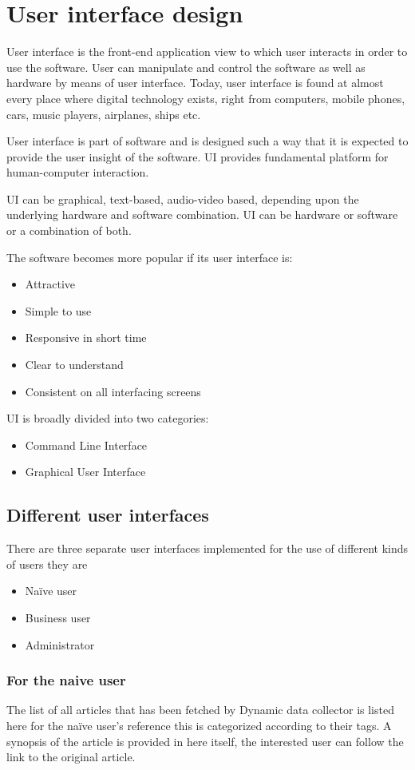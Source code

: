 \section{User interface design}
\par 
User interface is the front-end application view to which user interacts in order to use the software. User can manipulate and control the software as well as hardware by means of user interface. Today, user interface is found at almost every place where digital technology exists, right from computers, mobile phones, cars, music players, airplanes, ships etc.
\par User interface is part of software and is designed such a way that it is expected to provide the user insight of the software. UI provides fundamental platform for human-computer interaction.
\par UI can be graphical, text-based, audio-video based, depending upon the underlying hardware and software combination. UI can be hardware or software or a combination of both.

The software becomes more popular if its user interface is:
\begin{itemize}
\item Attractive
\item Simple to use
\item Responsive in short time
\item Clear to understand
\item Consistent on all interfacing screens
\end{itemize}
UI is broadly divided into two categories:
\begin{itemize}
\item Command Line Interface
\item Graphical User Interface
\end{itemize}
\subsection{Different user interfaces}
\par There are three separate user interfaces implemented for the use of different kinds of users they are 
\begin{itemize}
\item Naïve user
\item Business user
\item Administrator
\end{itemize}
\subsubsection{For the naive user}
\par The list of all articles that has been fetched by Dynamic data collector is listed here for the naïve user’s reference this is categorized according to their tags.  A synopsis of the article is provided in here itself, the interested user can follow the link to the original article.

